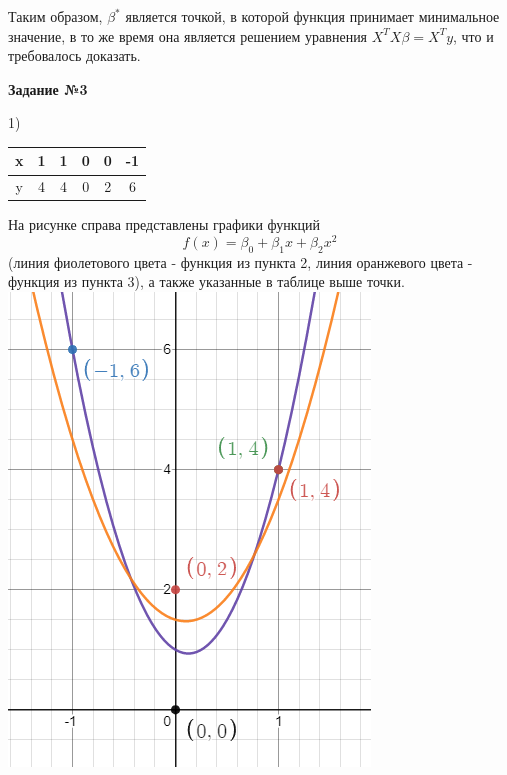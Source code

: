 \documentclass{report}
\begin{document}
\par Таким образом, $\beta^*$ является точкой, в которой функция принимает минимальное значение, в то же время она является решением уравнения $X^T X \beta = X^T y$, что и требовалось доказать.

\newpage
\par \textbf{Задание №3}

\par 1)
\begin{multicols}{2}
\begin{center}
\begin{tabular}{ |c|c c c c c| } 
\hline
x & 1 & 1 & 0 & 0 & -1 \\
\hline
y & 4 & 4 & 0 & 2 & 6 \\
\hline
\end{tabular}
\end{center}
\par На рисунке справа представлены графики функций $$f(x) = \beta_0 + \beta_1 x + \beta_2 x^2$$ (линия фиолетового цвета - функция из пункта 2, линия оранжевого цвета - функция из пункта 3), а также указанные в таблице выше точки.
\columnbreak
\includegraphics{task3.png}
\end{multicols}
\end{document}
